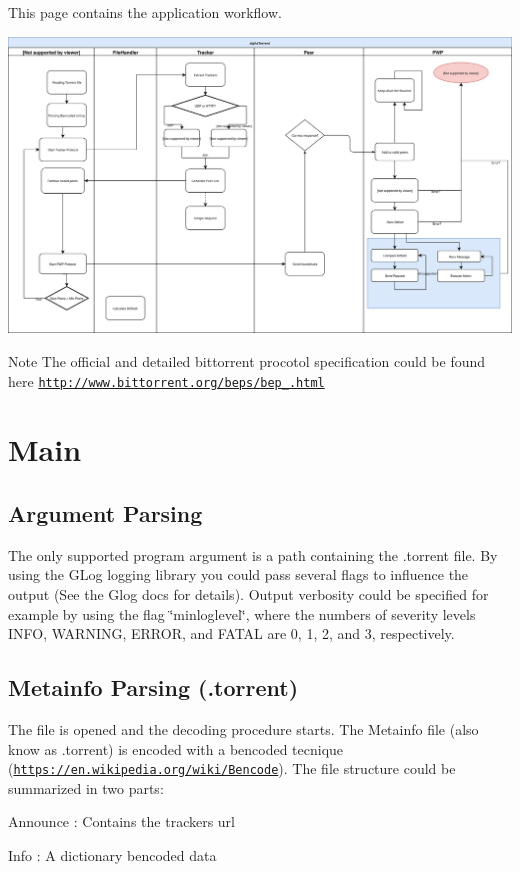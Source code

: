 This page contains the application workflow.

 
\begin{DoxyImageNoCaption}
  \mbox{\includegraphics[width=\textwidth,height=\textheight/2,keepaspectratio=true]{alphatorrent_flowchart.svg}}
\end{DoxyImageNoCaption}


\begin{DoxyNote}{Note}
The official and detailed bittorrent procotol specification could be found here \href{http://www.bittorrent.org/beps/bep_0003.html}{\tt http\+://www.\+bittorrent.\+org/beps/bep\+\_.\+html}
\end{DoxyNote}
\section*{Main }

\subsection*{Argument Parsing }

The only supported program argument is a path containing the .torrent file. By using the G\+Log logging library you could pass several flags to influence the output (See the Glog docs for details). Output verbosity could be specified for example by using the flag \char`\"{}minloglevel\char`\"{}, where the numbers of severity levels I\+N\+FO, W\+A\+R\+N\+I\+NG, E\+R\+R\+OR, and F\+A\+T\+AL are 0, 1, 2, and 3, respectively.

\subsection*{Metainfo Parsing (.torrent) }

The file is opened and the decoding procedure starts. The Metainfo file (also know as .torrent) is encoded with a bencoded tecnique (\href{https://en.wikipedia.org/wiki/Bencode}{\tt https\+://en.\+wikipedia.\+org/wiki/\+Bencode}). The file structure could be summarized in two parts\+:
\begin{DoxyEnumerate}
\item Announce \+: Contains the trackers url
\item Info \+: A dictionary bencoded data
\end{DoxyEnumerate}

